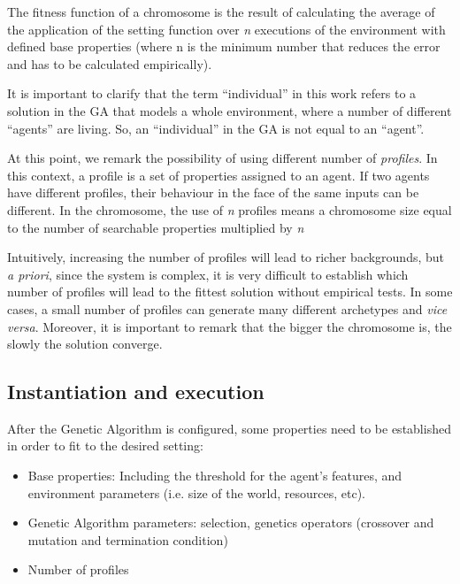 \documentclass{sig-alternate}
\begin{document}
The fitness function of a chromosome is the result of calculating the average of the application of the setting function over \textit{n} executions of the environment with defined base properties (where n is the minimum number that reduces the error and has to be calculated empirically).

It is important to clarify that the term ``individual'' in this work refers to a solution in the GA that models a whole environment, where a number of different ``agents'' are living. So, an ``individual'' in the GA is not equal to an ``agent''.  %


At this point, we remark the possibility of using different number of {\em profiles}. In this context, a profile is a set of properties assigned to an agent. If two agents have different profiles, their behaviour in the face of the same inputs can be different. In the chromosome, the use of \textit{n} profiles means a chromosome size equal to the number of searchable properties multiplied by \textit{n} 

Intuitively, increasing the number of profiles will lead to richer backgrounds, but \textit{a priori}, since the system is complex, it is very difficult to establish which number of profiles will lead to the fittest solution without empirical tests. In some cases, a small number of profiles can generate many different archetypes and \textit{vice versa}. Moreover, it is important to remark that the bigger the chromosome is, the slowly the solution converge.


\subsection{Instantiation and execution}

After the Genetic Algorithm is configured, some properties need to be established in order to fit to the desired setting:
\begin{itemize}
\item Base properties: Including the threshold for the agent's features, and environment parameters (i.e. size of the world, resources, etc).
\item Genetic Algorithm parameters: selection, genetics operators (crossover and mutation and termination condition)
\item Number of profiles
\end{itemize}
\end{document}
